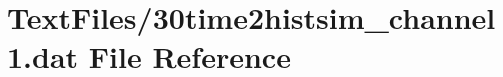 \hypertarget{30time2histsim__channel1_8dat}{}\section{Text\+Files/30time2histsim\+\_\+channel1.dat File Reference}
\label{30time2histsim__channel1_8dat}
